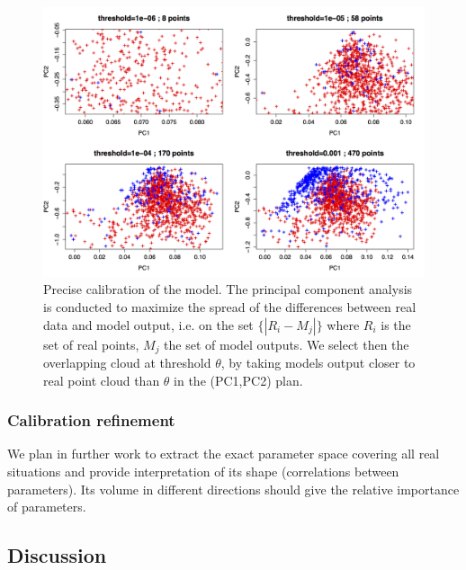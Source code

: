 \begin{figure}
\includegraphics[width=\textwidth]{Figures/PartII/Modeling/UrbanGrowth/pcaDiff_thresholds}
\caption[Precise calibration of the model]{Precise calibration of the model. The principal component analysis is conducted to maximize the spread of the differences between real data and model output, i.e. on the set $\{\left|R_i - M_j\right|\}$ where $R_i$ is the set of real points, $M_j$ the set of model outputs. We select then the overlapping cloud at threshold $\theta$, by taking models output closer to real point cloud than $\theta$ in the (PC1,PC2) plan.}
\label{fig:densitycalib}
\end{figure}



\subsubsection{Calibration refinement}

We plan in further work to extract the exact parameter space covering all real situations and provide interpretation of its shape (correlations between parameters). Its volume in different directions should give the relative importance of parameters.





\subsection{Discussion}

